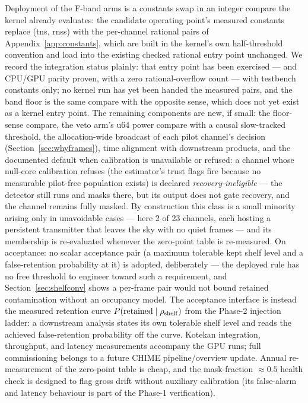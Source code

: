 Deployment of the F-band arms is a constants swap in an integer compare
the kernel already evaluates: the candidate operating point's measured
constants replace (tns,
rnss) with the per-channel rational pairs of Appendix~\ref{app:constants},
which are built in the kernel's own half-threshold convention and load
into the existing checked rational entry point unchanged. We record the
integration status plainly: that entry point has been exercised --- and
CPU/GPU parity proven, with a zero rational-overflow count --- with
testbench constants only; no kernel run has yet been handed the
measured pairs, and the band floor is the same compare with the
opposite sense, which does not yet exist as a kernel entry point. The
remaining components are new, if small: the floor-sense compare, the veto
arm's u64 power compare with a causal slow-tracked threshold, the
allocation-wide broadcast of each pilot channel's decision
(Section~\ref{sec:whyframes}), time alignment with downstream products,
and the documented default when calibration is unavailable or refused:
a channel whose null-core calibration refuses (the estimator's trust
flags fire because no measurable pilot-free population exists) is
declared \emph{recovery-ineligible} --- the detector still runs and
masks there, but its output does not gate recovery, and the channel
remains fully masked. By construction this class is a small minority
arising only in unavoidable cases --- here 2 of 23 channels, each
hosting a persistent transmitter that leaves the sky with no quiet
frames --- and its membership is re-evaluated whenever the zero-point
table is re-measured.
On acceptance: no scalar acceptance pair (a maximum tolerable kept
shelf level and a false-retention probability at it) is adopted,
deliberately --- the deployed rule has no free threshold to engineer
toward such a requirement, and Section~\ref{sec:shelfconv} shows a
per-frame pair would not bound retained contamination without an
occupancy model. The acceptance interface is instead the measured
retention curve $P(\mathrm{retained} \mid \rho_{\rm shelf})$ from
the Phase-2 injection ladder: a downstream analysis states its own
tolerable shelf level and reads the achieved false-retention
probability off the curve. Kotekan integration, throughput, and latency measurements
accompany the GPU runs; full commissioning belongs to a future CHIME
pipeline/overview update. Annual re-measurement of the
zero-point table is cheap, and the mask-fraction $\approx 0.5$ health
check is designed to flag gross drift without auxiliary calibration (its
false-alarm and latency behaviour is part of the Phase-1 verification).
